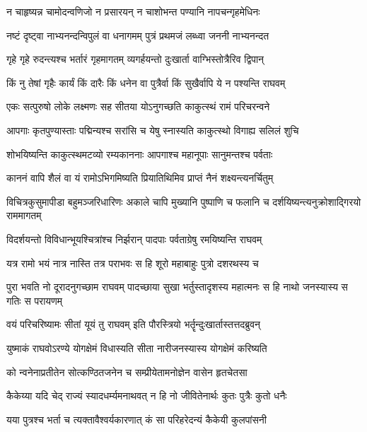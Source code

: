 \twolineshloka
{न चाहृष्यन्न चामोदन्वणिजो न प्रसारयन्}
{न चाशोभन्त पण्यानि नापचन्गृहमेधिनः} %

\twolineshloka
{नष्टं दृष्ट्वा नाभ्यनन्दन्विपुलं वा धनागमम्}
{पुत्रं प्रथमजं लब्ध्वा जननी नाभ्यनन्दत} %

\twolineshloka
{गृहे गृहे रुदन्त्यश्च भर्तारं गृहमागतम्}
{व्यगर्हयन्तो दुःखार्ता वाग्भिस्तोत्रैरिव द्विपान्} %

\twolineshloka
{किं नु तेषां गृहैः कार्यं किं दारैः किं धनेन वा}
{पुत्रैर्वा किं सुखैर्वापि ये न पश्यन्ति राघवम्} %

\twolineshloka
{एकः सत्पुरुषो लोके लक्ष्मणः सह सीतया}
{योऽनुगच्छति काकुत्स्थं रामं परिचरन्वने} %

\twolineshloka
{आपगाः कृतपुण्यास्ताः पद्मिन्यश्च सरांसि च}
{येषु स्नास्यति काकुत्स्थो विगाह्य सलिलं शुचि} %

\twolineshloka
{शोभयिष्यन्ति काकुत्स्थमटव्यो रम्यकाननाः}
{आपगाश्च महानूपाः सानुमन्तश्च पर्वताः} %

\twolineshloka
{काननं वापि शैलं वा यं रामोऽभिगमिष्यति}
{प्रियातिथिमिव प्राप्तं नैनं शक्ष्यन्त्यनर्चितुम्} %

\threelineshloka
{विचित्रकुसुमापीडा बहुमञ्जरिधारिणः}
{अकाले चापि मुख्यानि पुष्पाणि च फलानि च}
{दर्शयिष्यन्त्यनुक्रोशाद्गिरयो राममागतम्} %

\twolineshloka
{विदर्शयन्तो विविधान्भूयश्चित्रांश्च निर्झरान्}
{पादपाः पर्वताग्रेषु रमयिष्यन्ति राघवम्} %

\twolineshloka
{यत्र रामो भयं नात्र नास्ति तत्र पराभवः}
{स हि शूरो महाबाहुः पुत्रो दशरथस्य च} %

\threelineshloka
{पुरा भवति नो दूरादनुगच्छाम राघवम्}
{पादच्छाया सुखा भर्तुस्तादृशस्य महात्मनः}
{स हि नाथो जनस्यास्य स गतिः स परायणम्} %

\twolineshloka
{वयं परिचरिष्यामः सीतां यूयं तु राघवम्}
{इति पौरस्त्रियो भर्तॄन्दुःखार्तास्तत्तदब्रुवन्} %

\twolineshloka
{युष्माकं राघवोऽरण्ये योगक्षेमं विधास्यति}
{सीता नारीजनस्यास्य योगक्षेमं करिष्यति} %

\twolineshloka
{को न्वनेनाप्रतीतेन सोत्कण्ठितजनेन च}
{सम्प्रीयेतामनोज्ञेन वासेन हृतचेतसा} %

\twolineshloka
{कैकेय्या यदि चेद् राज्यं स्यादधर्म्यमनाथवत्}
{न हि नो जीवितेनार्थः कुतः पुत्रैः कुतो धनैः} %

\twolineshloka
{यया पुत्रश्च भर्ता च त्यक्तावैश्वर्यकारणात्}
{कं सा परिहरेदन्यं कैकेयी कुलपांसनी} %

